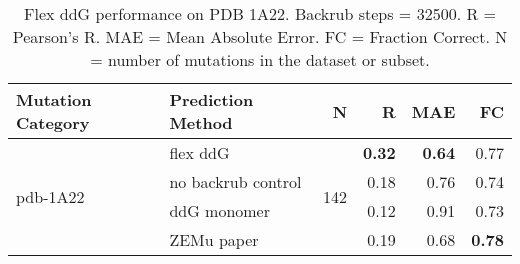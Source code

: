 \begin{table}
  \begin{tabular}{llrrrr}
\toprule
Mutation Category &   Prediction Method &    N &    R &  MAE &   FC \\
\midrule
 \multirow{ 4}{*}{pdb-1A22} & flex ddG & \multirow{ 4}{*}{142} & \textbf{0.32} & \textbf{0.64} & 0.77  \\
 & no backrub control & & 0.18 & 0.76 & 0.74  \\
 & ddG monomer & & 0.12 & 0.91 & 0.73  \\
 & ZEMu paper & & 0.19 & 0.68 & \textbf{0.78}  \\
\bottomrule
\end{tabular}
  \caption[Flex ddG performance on PDB 1A22]{
    Flex ddG performance on PDB 1A22. Backrub steps = 32500. R = Pearson's R. MAE = Mean Absolute Error. FC = Fraction Correct. N = number of mutations in the dataset or subset.
  } \label{tab:table-pdb-1A22}
\end{table}
